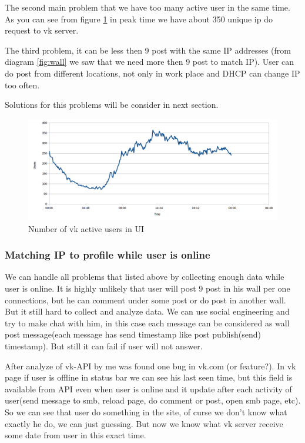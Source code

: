 The second main problem that we have too many active user in the same time. As you can see from figure \ref{fig:users} in peak time we have about 350 unique ip do request to vk server. 

The third problem, it can be less then 9 post with the same IP addresses (from diagram \ref{fig:wall} we saw that we need more then 9 post to match IP). User can do post from different locations, not only in work place and DHCP can change IP too often.

Solutions for this problems will be consider in next section.
\begin{figure}[H]
	\centering
		\includegraphics[width=180mm]{images/vk/users.png}
	\caption{Number of vk active users in UI}
	\label{fig:users}
\end{figure}
\subsubsection{Matching IP to profile while user is online}
We can handle all problems that listed above by collecting enough data while user is online. It is highly unlikely that user will post 9 post in his wall per one connections, but he can comment under some post or do post in another wall. But it still hard to collect and  analyze data. We can use social engineering and try to make chat with him, in this case each message can be considered as wall post message(each message has send timestamp like post publish(send) timestamp). But still it can fail if user will not answer. 

After analyze of vk-API by me was found one bug in vk.com (or feature?). In vk page if user is offline in status bar we can see his last seen time, but this field is available from API even when user is online and it update after each activity of user(send message to smb, reload page, do comment or post, open smb page, etc). So we can see that user do something in the site, of curse we don't know what exactly he do, we can just guessing. But now we know what vk server receive some date from user in this exact time.

